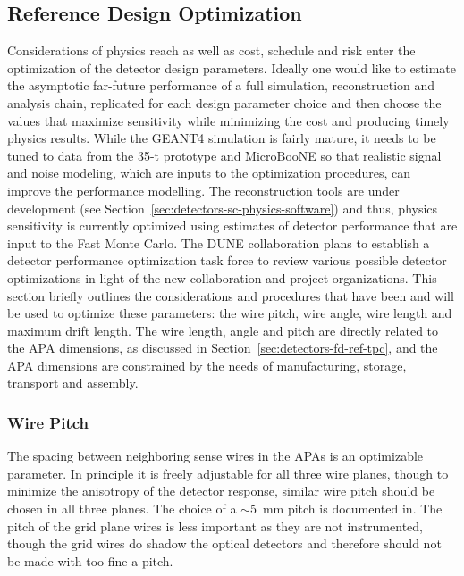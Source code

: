 \subsection{Reference Design Optimization}
\label{sec:detectors-fd-ref-optimization}

Considerations of physics reach as well as cost, schedule and risk
enter the optimization of the detector design parameters.  Ideally one
would like to estimate the asymptotic far-future performance of a full
simulation, reconstruction and analysis chain, replicated for each
design parameter choice and then choose the values that maximize
sensitivity while minimizing the cost and producing timely physics
results. While the GEANT4 simulation is fairly mature, it needs to be
tuned to data from the 35-t prototype and MicroBooNE so that realistic
signal and noise modeling, which are inputs to the optimization
procedures, can improve the performance modelling.  The reconstruction
tools are under development (see
Section~\ref{sec:detectors-sc-physics-software}) and thus, physics
sensitivity is currently optimized using estimates of detector
performance that are input to the Fast Monte Carlo. The DUNE
collaboration plans to establish a detector performance optimization
task force to review various possible detector optimizations in light
of the new collaboration and project organizations.  This section
briefly outlines the considerations and procedures that have been and
will be used to optimize these parameters: the wire pitch, wire angle,
wire length and maximum drift length.  The wire length, angle and
pitch are directly related to the APA dimensions, as discussed in
Section~\ref{sec:detectors-fd-ref-tpc}, and the APA dimensions are
constrained by the needs of manufacturing, storage, transport and
assembly.

\subsubsection{Wire Pitch}

The spacing between neighboring sense wires in the APAs is an
optimizable parameter.  In principle it is freely adjustable for all
three wire planes, though to minimize the anisotropy of the detector
response, similar wire pitch should be chosen in all three planes.
The choice of a $\sim$5~mm pitch is documented in\cite{docdb-3407}.
The pitch of the grid plane wires is less important as they are not
instrumented, though the grid wires do shadow the optical detectors
and therefore should not be made with too fine a pitch.

